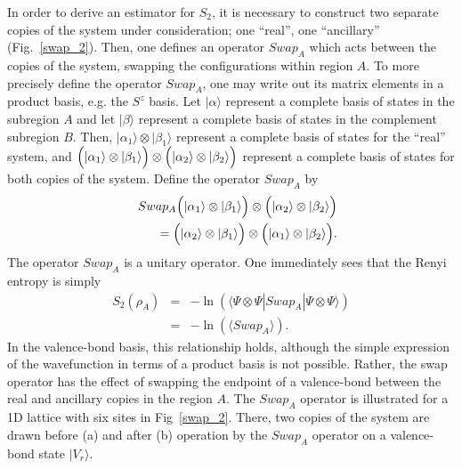 \documentclass[prl,aps,twocolumn,floatfix,amsmath,amssymb,superscriptaddress,tightenlines]{revtex4}
\begin{document}
In order to derive an estimator for $S_2$, it is necessary to construct two separate copies of the
system under consideration; one ``real'', one ``ancillary'' (Fig.~\ref{swap_2}).
Then, one defines an
operator $Swap_A$ which acts between the copies of the system, swapping the
configurations within region $A$.  To more precisely define the operator
$Swap_A$, one may write out its matrix elements in a product basis, e.g. the $S^z$ basis.
Let $|\alpha\rangle$  represent a complete basis of states in the subregion
$A$ and let $|\beta\rangle$ represent a complete basis of states in
the complement subregion $B$.  Then, $|\alpha_1 \rangle \otimes |\beta_1 \rangle$ represent
a complete basis of states for the ``real'' system, and
$\Bigl( |\alpha_1\rangle \otimes |\beta_1\rangle \Bigr) \otimes
\Bigl( |\alpha_2\rangle \otimes |\beta_2\rangle \Bigr)$
represent a complete basis of states for both copies of the system.
Define the operator $Swap_A$ by
\begin{eqnarray}
&& Swap_A \Bigl( |\alpha_1\rangle \otimes |\beta_1\rangle \Bigr) \otimes
\Bigl( |\alpha_2\rangle \otimes |\beta_2\rangle \Bigr) \nonumber \\ &&=
\Bigl( |\alpha_2\rangle \otimes |\beta_1\rangle \Bigr) \otimes
\Bigl( |\alpha_1\rangle \otimes |\beta_2\rangle \Bigr).
\end{eqnarray}
The operator $Swap_A$ is a unitary operator.
One immediately sees that the Renyi entropy is simply
\begin{eqnarray}
\label{H2fromSwap}
S_2(\rho_A) &=&-\ln(\langle \Psi\otimes \Psi|Swap_A|\Psi\otimes \Psi\rangle) \\
&=&-\ln(\langle Swap_A \rangle). \label{s2}
\end{eqnarray}
In the valence-bond basis, this relationship holds, although the simple expression of the wavefunction in terms
of a product basis is not possible.  Rather, the swap operator has the
effect of swapping the endpoint of a valence-bond between the real and ancillary copies in the region $A$.
The $Swap_A$ operator is illustrated for a 1D lattice with six sites in Fig~\ref{swap_2}.  
There, two copies of the system are drawn before (a) and after (b) operation by the $Swap_A$ operator on a
valence-bond state $|V_r\rangle$.
\end{document}
